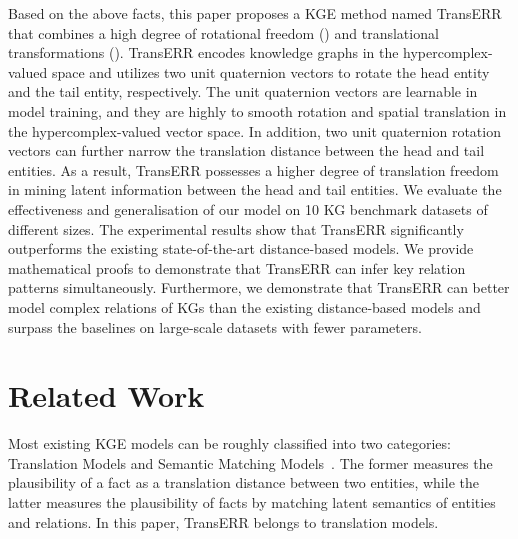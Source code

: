 \documentclass[10pt, a4paper]{article}
\begin{document}
Based on the above facts, this paper proposes a KGE method named TransERR that combines a high degree of rotational freedom () and translational transformations (). TransERR encodes knowledge graphs in the hypercomplex-valued space and utilizes two unit quaternion vectors to rotate the head entity and the tail entity, respectively. The unit quaternion vectors are learnable in model training, and they are highly to smooth rotation and spatial translation in the hypercomplex-valued vector space. In addition, two unit quaternion rotation vectors can further narrow the translation distance between the head and tail entities. As a result, TransERR possesses a higher degree of translation freedom in mining latent information between the head and tail entities. We evaluate the effectiveness and generalisation of our model on 10 KG benchmark datasets of different sizes. The experimental results show that TransERR significantly outperforms the existing state-of-the-art distance-based models.  We provide mathematical proofs to demonstrate that TransERR can infer key relation patterns simultaneously. Furthermore, we demonstrate that TransERR can better model complex relations of KGs than the existing distance-based models and surpass the baselines on large-scale datasets with fewer parameters.



\section{Related Work}
Most existing KGE models can be roughly classified into two categories: Translation Models and Semantic Matching Models~\cite{wang2017knowledge,ji2021survey}. The former measures the plausibility of a fact as a translation distance between two entities, while the latter measures the plausibility of facts by matching latent semantics of entities and relations. In this paper, TransERR belongs to translation models.
\end{document}
